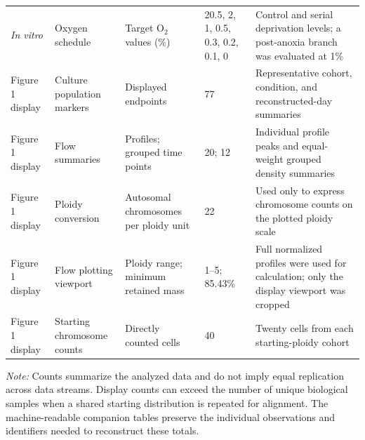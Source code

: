 \begin{table}[!htbp]
{\begin{tabular}{@{}p{}p{}p{}p{}p{}@{}}
\textit{In vitro} & Oxygen schedule & Target O$_2$ values (\%) & 20.5, 2, 1, 0.5, 0.3, 0.2, 0.1, 0 & Control and serial deprivation levels; a post-anoxia branch was evaluated at 1\% \\
Figure 1 display & Culture population markers & Displayed endpoints & 77 & Representative cohort, condition, and reconstructed-day summaries \\
Figure 1 display & Flow summaries & Profiles; grouped time points & 20; 12 & Individual profile peaks and equal-weight grouped density summaries \\
Figure 1 display & Ploidy conversion & Autosomal chromosomes per ploidy unit & 22 & Used only to express chromosome counts on the plotted ploidy scale \\
Figure 1 display & Flow plotting viewport & Ploidy range; minimum retained mass & 1--5; 85.43\% & Full normalized profiles were used for calculation; only the display viewport was cropped \\
Figure 1 display & Starting chromosome counts & Directly counted cells & 40 & Twenty cells from each starting-ploidy cohort \\
\bottomrule
\end{tabular}%
}
\par\vspace{0.5em}
\begin{minipage}{0.96\textwidth}
\footnotesize
\textit{Note:} Counts summarize the analyzed data and do not imply equal replication across data streams. Display counts can exceed the number of unique biological samples when a shared starting distribution is repeated for alignment. The machine-readable companion tables preserve the individual observations and identifiers needed to reconstruct these totals.
\end{minipage}
\end{table}
